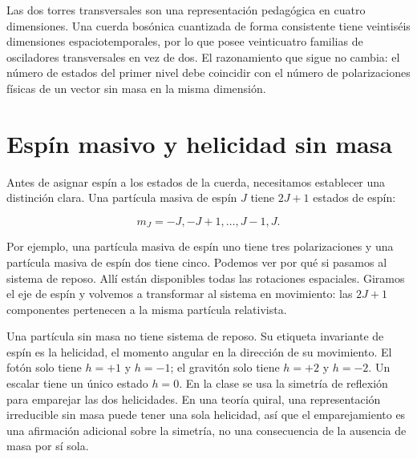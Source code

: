Las dos torres transversales son una representación pedagógica en cuatro dimensiones. Una cuerda bosónica cuantizada de forma consistente tiene veintiséis dimensiones espaciotemporales, por lo que posee veinticuatro familias de osciladores transversales en vez de dos. El razonamiento que sigue no cambia: el número de estados del primer nivel debe coincidir con el número de polarizaciones físicas de un vector sin masa en la misma dimensión.

\section{Espín masivo y helicidad sin masa}

Antes de asignar espín a los estados de la cuerda, necesitamos establecer una distinción clara. Una partícula masiva de espín \(J\) tiene \(2J+1\) estados de espín:

\begin{equation}
  m_J=-J,-J+1,\ldots,J-1,J.
  \label{eq:l03-massive-spin-multiplet}
\end{equation}

Por ejemplo, una partícula masiva de espín uno tiene tres polarizaciones y una partícula masiva de espín dos tiene cinco. Podemos ver por qué si pasamos al sistema de reposo. Allí están disponibles todas las rotaciones espaciales. Giramos el eje de espín y volvemos a transformar al sistema en movimiento: las \(2J+1\) componentes pertenecen a la misma partícula relativista.

Una partícula sin masa no tiene sistema de reposo. Su etiqueta invariante de espín es la helicidad, el momento angular en la dirección de su movimiento. El fotón solo tiene \(h=+1\) y \(h=-1\); el gravitón solo tiene \(h=+2\) y \(h=-2\). Un escalar tiene un único estado \(h=0\). En la clase se usa la simetría de reflexión para emparejar las dos helicidades. En una teoría quiral, una representación irreducible sin masa puede tener una sola helicidad, así que el emparejamiento es una afirmación adicional sobre la simetría, no una consecuencia de la ausencia de masa por sí sola.

